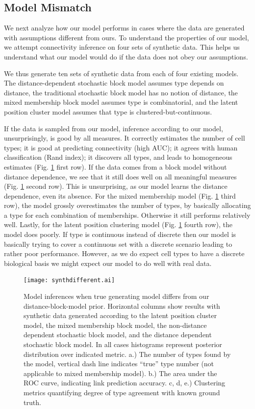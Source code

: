 \documentclass{article}
\begin{document}
\subsection*{Model Mismatch}
We next analyze how our model performs in cases where the data are
generated with assumptions different from ours.  To understand the
properties of our model, we attempt connectivity inference on four
sets of synthetic data. This helps us understand what our model would
do if the data does not obey our assumptions.

We thus generate ten sets of synthetic data from each of four existing
models.  The distance-dependent stochastic block model assumes type
depends on distance, the traditional stochastic block model has no
notion of distance, the mixed membership block model assumes type is
combinatorial, and the latent position cluster model assumes that type
is clustered-but-continuous.

If the data is sampled from our model, inference according to our
model, unsurprisingly, is good by all measures. It correctly estimates
the number of cell types; it is good at predicting connectivity (high
AUC); it agrees with human classification (Rand index); it discovers
all types, and leads to homogeneous estimates
(Fig. \ref{fig:othermodel} first row). If the data comes from a block
model without distance dependence, we see that it still does well on
all meaningful measures (Fig. \ref{fig:othermodel} second row). This
is unsurprising, as our model learns the distance dependence, even its
absence. For the mixed membership model (Fig. \ref{fig:othermodel}
third row), the model grossly overestimates the number of types, by
basically allocating a type for each combination of
memberships. Otherwise it still performs relatively well. Lastly, for
the latent position clustering model (Fig. \ref{fig:othermodel} fourth
row), the model does poorly. If type is continuous instead of discrete
then our model is basically trying to cover a continuous set with a
discrete scenario leading to rather poor performance. However, as we
do expect cell types to have a discrete biological basis we might
expect our model to do well with real data.


\begin{figure}
  \centering 

  \texttt{[image: synthdifferent.ai]}
  \caption{Model inferences when true generating model differs from
    our distance-block-model prior. Horizontal columns show results
    with synthetic data generated according to the latent position
    cluster model, the mixed membership block model, the non-distance
    dependent stochastic block model, and the distance dependent
    stochastic block model. In all cases histograms represent
    posterior distribution over indicated metric. a.) The number of
    types found by the model, vertical dash line indicates ``true''
    type number (not applicable to mixed membership model). b.) The
    area under the ROC curve, indicating link prediction accuracy. c,
    d, e.) Clustering metrics quantifying degree of type agreement
    with known ground truth. }

  \label{fig:othermodel}
\end{figure}
\end{document}
